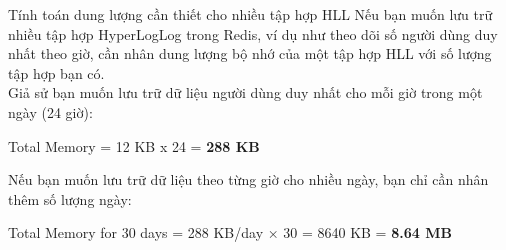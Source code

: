 \documentclass[10pt]{beamer}
\begin{document}
\begin{frame}[fragile]{Tính toán dung lượng cần thiết cho nhiều tập hợp HLL}
Nếu bạn muốn lưu trữ nhiều tập hợp HyperLogLog trong Redis, ví dụ như 
theo dõi số người dùng duy nhất theo giờ, cần nhân dung lượng bộ nhớ 
của một tập hợp HLL với số lượng tập hợp bạn có.\\
Giả sử bạn muốn lưu trữ dữ liệu người dùng duy nhất cho mỗi giờ trong 
một ngày (24 giờ):\\
\begin{center}
  Total Memory = 12 KB x 24 = \textbf{288 KB}
\end{center} 
Nếu bạn muốn lưu trữ dữ liệu theo từng giờ cho nhiều ngày, bạn chỉ cần 
nhân thêm số lượng ngày:
\begin{center}
  Total Memory for 30 days = 288 KB/day × 30 = 8640 KB = \textbf{8.64 MB}
\end{center} 
\end{frame}

\end{document}
